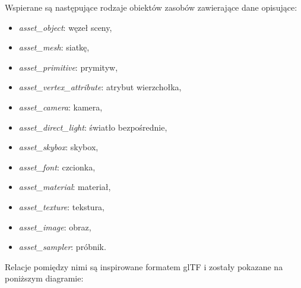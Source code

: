 Wspierane są następujące rodzaje obiektów zasobów zawierające dane opisujące:
\begin{itemize}
	\item \textit{asset\_object}: węzeł sceny,
	\item \textit{asset\_mesh}: siatkę,
	\item \textit{asset\_primitive}: prymityw,
	\item \textit{asset\_vertex\_attribute}: atrybut wierzchołka,
	\item \textit{asset\_camera}: kamera,
	\item \textit{asset\_direct\_light}: światło bezpośrednie,
	\item \textit{asset\_skybox}: skybox,
	\item \textit{asset\_font}: czcionka,
	\item \textit{asset\_material}: materiał,
	\item \textit{asset\_texture}: tekstura,
	\item \textit{asset\_image}: obraz,
	\item \textit{asset\_sampler}: próbnik.
\end{itemize}
Relacje pomiędzy nimi są inspirowane formatem glTF i zostały pokazane na poniższym diagramie:
